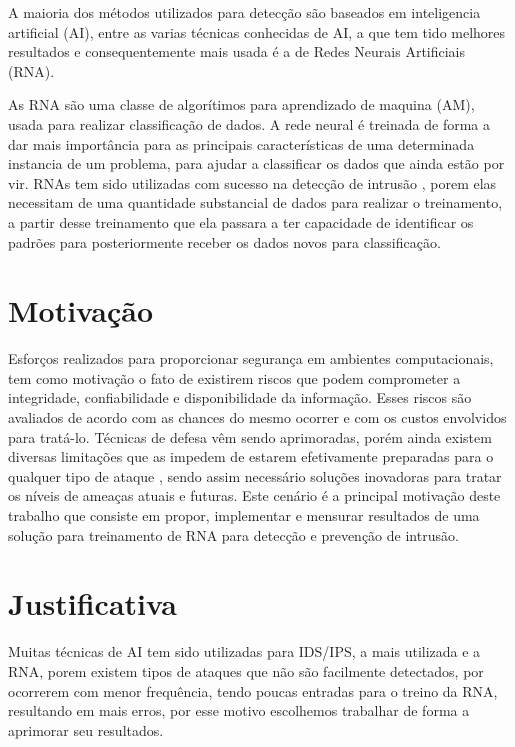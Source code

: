 \documentclass[
	12pt,				%
	openright,			%
	oneside,
	a4paper,			%
	english,			%
	french,				%
	spanish,			%
	brazil				%
	]{abntex2}
\begin{document}
A maioria dos métodos utilizados para detecção são baseados em inteligencia artificial (AI), entre as varias técnicas conhecidas de AI, a que tem tido melhores resultados e consequentemente mais usada é a de Redes Neurais Artificiais (RNA)\cite{Jake-Ryan}\cite{Stampar}.

As RNA são uma classe de algorítimos para aprendizado de maquina (AM), usada para realizar classificação de dados. A rede neural é treinada de forma a dar mais importância para as principais características de uma determinada instancia de um problema, para ajudar a classificar os dados que ainda estão por vir. 
RNAs tem sido utilizadas com sucesso na detecção de intrusão \cite{Zhang} \cite{Tong} \cite{Wonil}, porem elas necessitam de uma quantidade substancial de dados para realizar o treinamento, a partir desse treinamento que ela passara a ter capacidade de identificar os padrões para posteriormente receber os dados novos para classificação.


\section{Motivação}

Esforços realizados para proporcionar segurança em ambientes computacionais, tem como motivação o fato de existirem riscos que podem comprometer a integridade, confiabilidade e disponibilidade da informação. 
Esses riscos são avaliados de acordo com as chances do mesmo ocorrer e com os custos envolvidos para tratá-lo. Técnicas de defesa vêm sendo aprimoradas, porém ainda existem diversas limitações que as impedem de estarem efetivamente preparadas para o qualquer tipo de ataque \cite{CeC}, sendo assim necessário  soluções inovadoras para tratar os níveis de ameaças atuais e futuras. 
Este cenário é a principal motivação deste trabalho que consiste em propor, implementar e mensurar resultados de uma solução para treinamento de RNA para detecção e prevenção de intrusão.

\section{Justificativa}

Muitas técnicas de AI tem sido utilizadas para IDS/IPS, a mais utilizada e a RNA\cite{Stampar}, porem existem tipos de ataques que não são facilmente detectados, por ocorrerem com menor frequência, tendo poucas entradas para o treino da RNA\cite{CeC}, resultando em mais erros,  por esse motivo escolhemos trabalhar de forma a aprimorar seu resultados. 
\end{document}
